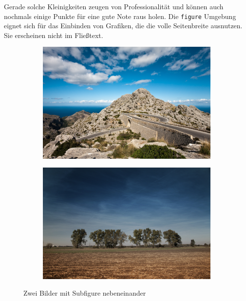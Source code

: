 Gerade solche Kleinigkeiten zeugen von Professionalität und können auch nochmals einige Punkte für eine gute Note raus holen. Die \texttt{figure} Umgebung eignet sich für das Einbinden von Grafiken, die die volle Seitenbreite ausnutzen. Sie erscheinen nicht im Fließtext.

\begin{figure}
	\begin{subfigure}[c]{0.49\textwidth}
		\includegraphics[width=\textwidth]{images/b1.jpg}
	\end{subfigure}
	\begin{subfigure}[c]{0.49\textwidth}
		\includegraphics[width=\textwidth]{images/b2.jpg}
	\end{subfigure}
	\caption{Zwei Bilder mit Subfigure nebeneinander}
\end{figure}

